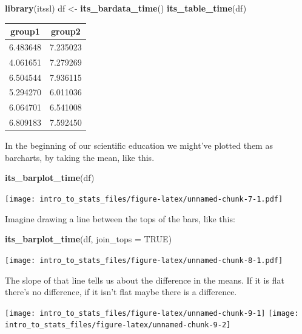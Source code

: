 \documentclass[
]{book}
\newenvironment{Shaded}{\begin{snugshade}}{\end{snugshade}}
\newcommand{\DataTypeTok}[1]{\textcolor[rgb]{0.13,0.29,0.53}{#1}}
\newcommand{\KeywordTok}[1]{\textcolor[rgb]{0.13,0.29,0.53}{\textbf{#1}}}
\newcommand{\NormalTok}[1]{#1}
\newcommand{\OtherTok}[1]{\textcolor[rgb]{0.56,0.35,0.01}{#1}}
\newcommand{\StringTok}[1]{\textcolor[rgb]{0.31,0.60,0.02}{#1}}
\begin{document}
\begin{Shaded}
\begin{Highlighting}[]
\KeywordTok{library}\NormalTok{(itssl)}
\NormalTok{df <-}\StringTok{ }\KeywordTok{its_bardata_time}\NormalTok{()}
\KeywordTok{its_table_time}\NormalTok{(df)}
\end{Highlighting}
\end{Shaded}

\begin{tabular}{c|c}
\hline
group1 & group2\\
\hline
6.483648 & 7.235023\\
\hline
4.061651 & 7.279269\\
\hline
6.504544 & 7.936115\\
\hline
5.294270 & 6.011036\\
\hline
6.064701 & 6.541008\\
\hline
6.809183 & 7.592450\\
\hline
\end{tabular}

In the beginning of our scientific education we might've plotted them as barcharts, by taking the mean, like this.

\begin{Shaded}
\begin{Highlighting}[]
\KeywordTok{its_barplot_time}\NormalTok{(df)}
\end{Highlighting}
\end{Shaded}

\texttt{[image: intro\_to\_stats\_files/figure-latex/unnamed-chunk-7-1.pdf]}

Imagine drawing a line between the tops of the bars, like this:

\begin{Shaded}
\begin{Highlighting}[]
\KeywordTok{its_barplot_time}\NormalTok{(df, }\DataTypeTok{join_tops =} \OtherTok{TRUE}\NormalTok{)}
\end{Highlighting}
\end{Shaded}

\texttt{[image: intro\_to\_stats\_files/figure-latex/unnamed-chunk-8-1.pdf]}

The slope of that line tells us about the difference in the means. If it is flat there's no difference, if it isn't flat maybe there is a difference.

\texttt{[image: intro\_to\_stats\_files/figure-latex/unnamed-chunk-9-1]} \texttt{[image: intro\_to\_stats\_files/figure-latex/unnamed-chunk-9-2]}
\end{document}
